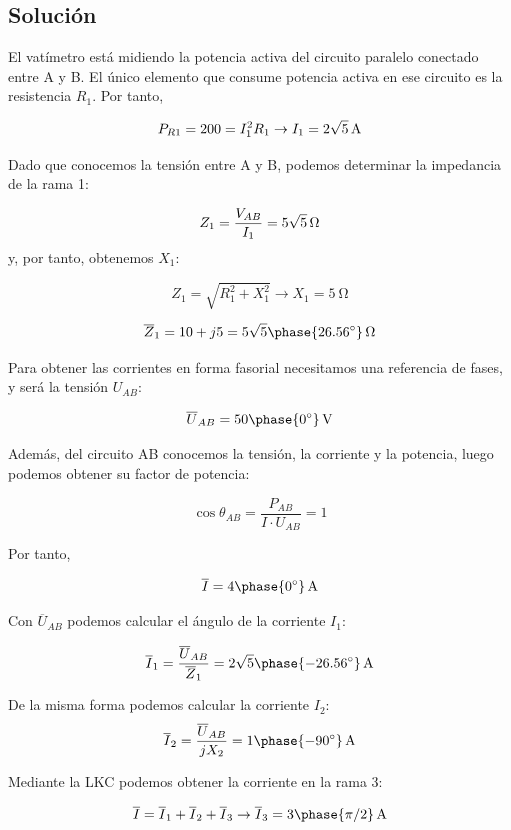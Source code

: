\subsection*{Solución}


El vatímetro está midiendo la potencia activa del circuito paralelo conectado entre A y B. El único elemento que consume potencia activa en ese circuito es la resistencia $R_1$. Por tanto,

\[
  P_{R1} = 200 = I_1^2 R_1 \rightarrow I_1 = \qty[parse-numbers=false]{2\sqrt{5}}{\ampere}
\]

Dado que conocemos la tensión entre A y B, podemos determinar la impedancia de la rama 1:

\[
  Z_1 = \frac{V_{AB}}{I_1} = \qty[parse-numbers=false]{5\sqrt{5}}{\ohm}
\]
y, por tanto, obtenemos $X_1$:

\[
  Z_1 = \sqrt{R_1^2 + X_1^2} \rightarrow X_1 = \qty{5}{\ohm}
\]

\[
  \overline{Z}_1 = 10 + j5 = \qty[parse-numbers=false]{5\sqrt{5}\phase{\ang{26.56}}}{\ohm} 
\]

Para obtener las corrientes en forma fasorial necesitamos una referencia de fases, y será la tensión $U_{AB}$:

\[
  \overline{U}_{AB} = \qty[parse-numbers=false]{50\phase{\ang{0}}}{\volt}
\]

Además, del circuito AB conocemos la tensión, la corriente y la potencia, luego podemos obtener su factor de potencia:

\[
  \cos\theta_{AB} = \frac{P_{AB}}{I \cdot U_{AB}} = 1
\]

Por tanto,

\[
  \overline{I} = \qty[parse-numbers=false]{4\phase{\ang{0}}}{\ampere}
\]


Con $\overline{U}_{AB}$ podemos calcular el ángulo de la corriente $I_1$:

\[
  \overline{I}_1 = \frac{\overline{U}_{AB}}{\overline{Z}_1} = \qty[parse-numbers=false]{2\sqrt{5}\phase{\ang{-26.56}}}{\ampere} 
\]

De la misma forma podemos calcular la corriente $I_2$:
\[
  \overline{I}_2 = \frac{\overline{U}_{AB}}{jX_2} = \qty[parse-numbers=false]{1\phase{\ang{-90}}}{\ampere} 
\]
  
Mediante la LKC podemos obtener la corriente en la rama 3:

\[
  \overline{I} = \overline{I}_1 + \overline{I}_2 + \overline{I}_3 \rightarrow \overline{I}_3 = \qty[parse-numbers=false]{3\phase{\pi/2}}{\ampere}
\]

